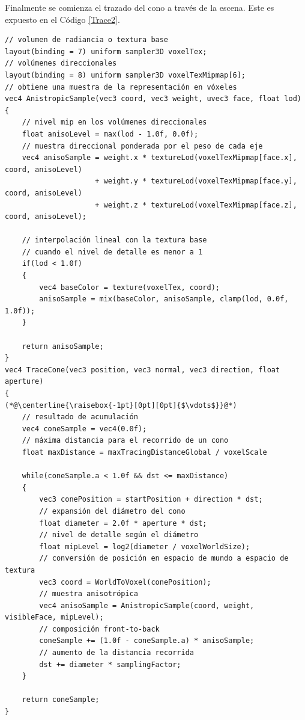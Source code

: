 Finalmente se comienza el trazado del cono a través de la escena. Este es expuesto en el Código \ref{Trace2}.
\\
\begin{lstlisting}[caption={Trazado de cono con vóxeles.}, label=Trace2]
// volumen de radiancia o textura base
layout(binding = 7) uniform sampler3D voxelTex;
// volúmenes direccionales
layout(binding = 8) uniform sampler3D voxelTexMipmap[6];
// obtiene una muestra de la representación en vóxeles
vec4 AnistropicSample(vec3 coord, vec3 weight, uvec3 face, float lod)
{
    // nivel mip en los volúmenes direccionales
    float anisoLevel = max(lod - 1.0f, 0.0f);
    // muestra direccional ponderada por el peso de cada eje
    vec4 anisoSample = weight.x * textureLod(voxelTexMipmap[face.x], coord, anisoLevel)
                     + weight.y * textureLod(voxelTexMipmap[face.y], coord, anisoLevel)
                     + weight.z * textureLod(voxelTexMipmap[face.z], coord, anisoLevel);

    // interpolación lineal con la textura base 
    // cuando el nivel de detalle es menor a 1
    if(lod < 1.0f)
    {
        vec4 baseColor = texture(voxelTex, coord);
        anisoSample = mix(baseColor, anisoSample, clamp(lod, 0.0f, 1.0f));
    }

    return anisoSample;                    
}
vec4 TraceCone(vec3 position, vec3 normal, vec3 direction, float aperture)
{
(*@\centerline{\raisebox{-1pt}[0pt][0pt]{$\vdots$}}@*)
    // resultado de acumulación
    vec4 coneSample = vec4(0.0f);
    // máxima distancia para el recorrido de un cono
    float maxDistance = maxTracingDistanceGlobal / voxelScale

    while(coneSample.a < 1.0f && dst <= maxDistance)
    {
        vec3 conePosition = startPosition + direction * dst;
        // expansión del diámetro del cono
        float diameter = 2.0f * aperture * dst;
        // nivel de detalle según el diámetro
        float mipLevel = log2(diameter / voxelWorldSize);
        // conversión de posición en espacio de mundo a espacio de textura
        vec3 coord = WorldToVoxel(conePosition);
        // muestra anisotrópica
        vec4 anisoSample = AnistropicSample(coord, weight, visibleFace, mipLevel);
        // composición front-to-back
        coneSample += (1.0f - coneSample.a) * anisoSample;
        // aumento de la distancia recorrida
        dst += diameter * samplingFactor;
    }

    return coneSample;
}
\end{lstlisting}

